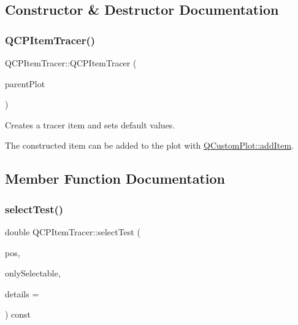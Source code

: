\subsection{Constructor \& Destructor Documentation}
\mbox{\label{class_q_c_p_item_tracer_adc5ca846eeac323db4aa1fc4081e36be}} 
\subsubsection{\texorpdfstring{Q\+C\+P\+Item\+Tracer()}{QCPItemTracer()}}
{\footnotesize\ttfamily Q\+C\+P\+Item\+Tracer\+::\+Q\+C\+P\+Item\+Tracer (\begin{DoxyParamCaption}\item[{\mbox{\hyperlink{class_q_custom_plot}{Q\+Custom\+Plot}} $\ast$}]{parent\+Plot }\end{DoxyParamCaption})}

Creates a tracer item and sets default values.

The constructed item can be added to the plot with \mbox{\hyperlink{class_q_custom_plot_aa500620379262321685cb7a7674cbd2a}{Q\+Custom\+Plot\+::add\+Item}}. 

\subsection{Member Function Documentation}
\mbox{\label{class_q_c_p_item_tracer_ae1dc728384936184e7552a6d0d67fd75}} 
\subsubsection{\texorpdfstring{select\+Test()}{selectTest()}}
{\footnotesize\ttfamily double Q\+C\+P\+Item\+Tracer\+::select\+Test (\begin{DoxyParamCaption}\item[{const Q\+PointF \&}]{pos,  }\item[{bool}]{only\+Selectable,  }\item[{Q\+Variant $\ast$}]{details = {} }\end{DoxyParamCaption}) const\hspace{0.3cm}{\ttfamily [virtual]}}


